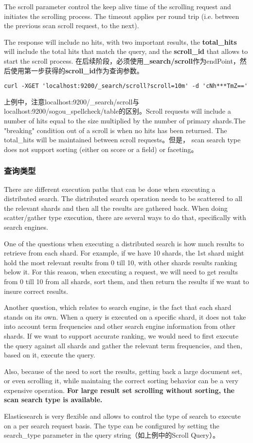 \par The scroll parameter control the keep alive time of the scrolling request and initiates the scrolling process. The timeout applies per round trip (i.e. between the previous scan scroll request, to the next).
\par The response will include no hits, with two important results, the \textbf{total\_hits} will include the total hits that match the query, and the \textbf{scroll\_id} that allows to start the scroll process. 在后续阶段，必须使用\textbf{\_search/scroll}作为endPoint，然后使用第一步获得的\textbf{scroll\_id}作为查询参数。
\begin{verbatim}
curl -XGET 'localhost:9200/_search/scroll?scroll=10m' -d 'cNh***TmZ=='
\end{verbatim}
\par 上例中，注意localhost:9200/\_search/scroll与localhost:9200/sogou\_spellcheck/table的区别。Scroll requests will include a number of hits equal to the size multiplied by the number of primary shards.The "breaking" condition out of a scroll is when no hits has been returned. The total\_hits will be maintained between scroll requests。但是， scan search type does not support sorting (either on score or a field) or faceting。
\subsubsection{查询类型}
\par There are different execution paths that can be done when executing a distributed search. The distributed search operation needs to be scattered to all the relevant shards and then all the results are gathered back. When doing scatter/gather type execution, there are several ways to do that, specifically with search engines.
\par One of the questions when executing a distributed search is how much results to retrieve from each shard. For example, if we have 10 shards, the 1st shard might hold the most relevant results from 0 till 10, with other shards results ranking below it. For this reason, when executing a request, we will need to get results from 0 till 10 from all shards, sort them, and then return the results if we want to insure correct results.
\par Another question, which relates to search engine, is the fact that each shard stands on its own. When a query is executed on a specific shard, it does not take into account term frequencies and other search engine information from other shards. If we want to support accurate ranking, we would need to first execute the query against all shards and gather the relevant term frequencies, and then, based on it, execute the query.
\par Also, because of the need to sort the results, getting back a large document set, or even scrolling it, while maintaing the correct sorting behavior can be a very expensive operation. \textbf{For large result set scrolling without sorting, the scan search type is available.}
\par Elasticsearch is very flexible and allows to control the type of search to execute on a per search request basis. The type can be configured by setting the search\_type parameter in the query string（如上例中的Scroll Query）。

